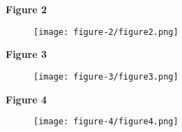 \documentclass[12pt, twoside, letterpaper]{article}
\begin{document}
\textbf{Figure 2}
\begin{figure}[ht]
  \texttt{[image: figure-2/figure2.png]}
\end{figure}
\newpage

\textbf{Figure 3}
\begin{figure}[ht]
  \texttt{[image: figure-3/figure3.png]}
\end{figure}
\newpage

\textbf{Figure 4}
\begin{figure}[ht]
  \texttt{[image: figure-4/figure4.png]}
\end{figure}
\newpage
\end{document}
